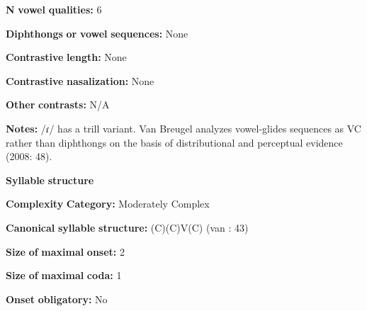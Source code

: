 \documentclass[output=paper]{langsci/langscibook}
\begin{document}
\begin{styleBody}
\textbf{N} \textbf{vowel} \textbf{qualities:} 6
\end{styleBody}

\begin{styleBody}
\textbf{Diphthongs} \textbf{or} \textbf{vowel} \textbf{sequences:} None
\end{styleBody}

\begin{styleBody}
\textbf{Contrastive} \textbf{length:} None
\end{styleBody}

\begin{styleBody}
\textbf{Contrastive} \textbf{nasalization:} None
\end{styleBody}

\begin{styleBody}
\textbf{Other} \textbf{contrasts:} N/A
\end{styleBody}

\begin{styleBody}
\textbf{Notes:} /ɾ/ has a trill variant. Van Breugel analyzes vowel-glides sequences as VC rather than diphthongs on the basis of distributional and perceptual evidence (2008: 48).
\end{styleBody}

\begin{styleBody}
\textbf{Syllable} \textbf{structure}
\end{styleBody}

\begin{styleBody}
\textbf{Complexity} \textbf{Category:} Moderately Complex
\end{styleBody}

\begin{styleBody}
\textbf{Canonical} \textbf{syllable} \textbf{structure:} (C)(C)V(C) (van \citealt{Breugel2008}: 43)
\end{styleBody}

\begin{styleBody}
\textbf{Size} \textbf{of} \textbf{maximal} \textbf{onset:} 2
\end{styleBody}

\begin{styleBody}
\textbf{Size} \textbf{of} \textbf{maximal} \textbf{coda:} 1
\end{styleBody}

\begin{styleBody}
\textbf{Onset} \textbf{obligatory:} No
\end{styleBody}
\end{document}
